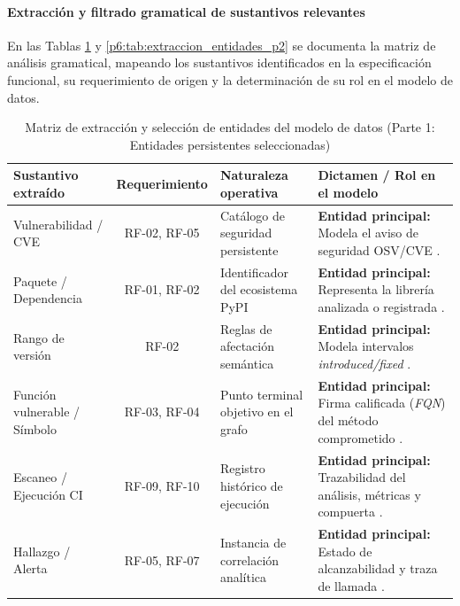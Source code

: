 \paragraph*{Extracción y filtrado gramatical de sustantivos relevantes}
En las Tablas \ref{p6:tab:extraccion_entidades_p1} y \ref{p6:tab:extraccion_entidades_p2} se documenta la matriz de análisis gramatical, mapeando los sustantivos identificados en la especificación funcional, su requerimiento de origen y la determinación de su rol en el modelo de datos.

\begin{table}[H]
\centering
\caption{Matriz de extracción y selección de entidades del modelo de datos (Parte 1: Entidades persistentes seleccionadas)}
\label{p6:tab:extraccion_entidades_p1}
\small
{}
\begin{tabularx}{\textwidth}{p{3.2cm} c p{4.8cm} X}
\toprule
\textbf{Sustantivo extraído} & \textbf{Requerimiento} & \textbf{Naturaleza operativa} & \textbf{Dictamen / Rol en el modelo} \\
\midrule
Vulnerabilidad / CVE & RF-02, RF-05 & Catálogo de seguridad persistente & \textbf{Entidad principal:} Modela el aviso de seguridad OSV/CVE \cite{openssf2023osv, torres2026proyecto}. \\
\addlinespace
Paquete / Dependencia & RF-01, RF-02 & Identificador del ecosistema PyPI & \textbf{Entidad principal:} Representa la librería analizada o registrada \cite{torres2026proyecto}. \\
\addlinespace
Rango de versión & RF-02 & Reglas de afectación semántica & \textbf{Entidad principal:} Modela intervalos \textit{introduced/fixed} \cite{openssf2023osv}. \\
\addlinespace
Función vulnerable / Símbolo & RF-03, RF-04 & Punto terminal objetivo en el grafo & \textbf{Entidad principal:} Firma calificada (\textit{FQN}) del método comprometido \cite{salis2021pycg}. \\
\addlinespace
Escaneo / Ejecución CI & RF-09, RF-10 & Registro histórico de ejecución & \textbf{Entidad principal:} Trazabilidad del análisis, métricas y compuerta \cite{humble2010continuous, torres2026proyecto}. \\
\addlinespace
Hallazgo / Alerta & RF-05, RF-07 & Instancia de correlación analítica & \textbf{Entidad principal:} Estado de alcanzabilidad y traza de llamada \cite{oasis2019sarif, torres2026proyecto}. \\
\bottomrule
\end{tabularx}
\end{table}


